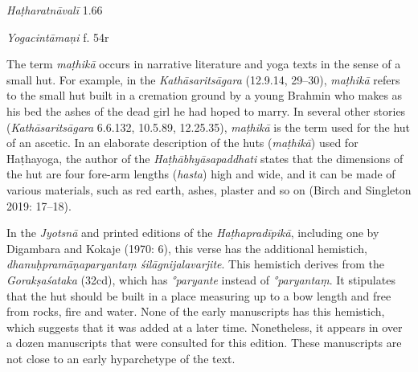 \begin{ekdosis}
\begin{sources}[hp01_012]
\end{sources}

\begin{testimonia}[hp01_012]
\emph{Haṭharatnāvalī} 1.66

\begin{versinnote}
\end{versinnote}

\emph{Yogacintāmaṇi} f. 54r

\begin{versinnote}
\end{versinnote}

\end{testimonia}

\begin{philcomm}[hp01_012]  
The term \emph{maṭhikā} occurs in narrative literature and yoga texts in the sense of a small hut. For example, in the \textit{Kathāsaritsāgara} (12.9.14, 29–30), \emph{maṭhikā} refers to the small hut built in a cremation ground by a young Brahmin who makes as his bed the ashes of the dead girl he had hoped to marry. In several other stories (\textit{Kathāsaritsāgara} 6.6.132, 10.5.89, 12.25.35), \emph{maṭhikā} is the term used for the hut of an ascetic. In an elaborate description of the huts (\emph{maṭhikā}) used for Haṭhayoga, the author of the \emph{Haṭhābhyāsapaddhati} states that the dimensions of the hut are four fore-arm lengths (\emph{hasta}) high and wide, and it can be made of various materials, such as red earth, ashes, plaster and so on (Birch and Singleton 2019: 17–18).

In the \emph{Jyotsnā} and printed editions of the \emph{Haṭhapradīpikā}, including one by Digambara and Kokaje (1970: 6), this verse has the additional hemistich, \emph{dhanuḥpramāṇaparyantaṃ śilāgnijalavarjite}. This hemistich derives from the \emph{Gorakṣaśataka} (32cd), which has \emph{°paryante} instead of \emph{°paryantaṃ}. It stipulates that the hut should be built in a place measuring up to a bow length and free from rocks, fire and water. None of the early manuscripts has this hemistich, which suggests that it was added at a later time. Nonetheless, it appears in over a dozen manuscripts that were consulted for this edition. These manuscripts are not close to an early hyp\-archetype of the text.
\end{philcomm}


\end{ekdosis}
